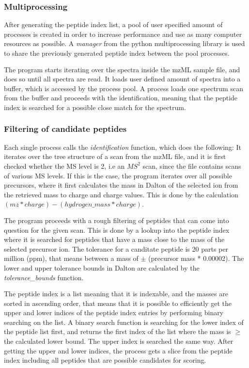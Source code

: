 \documentclass[11pt]{article}
\begin{document}
\subsubsection{Multiprocessing}
After generating the peptide index list, a pool of user specified amount of processes is created in order to increase performance and use as many computer resources as possible. A \textit{manager} from the python multiprocessing library is used to share the previously generated peptide index between the pool processes. 

The program starts iterating over the spectra inside the mzML sample file, and does so until all spectra are read. It loads user defined amount of spectra into a buffer, which is accessed by the process pool. A process loads one spectrum scan from the buffer and proceeds with the identification, meaning that the peptide index is searched for a possible close match for the spectrum.

\subsubsection{Filtering of candidate peptides}
Each single process calls the \textit{identification} function, which does the following:
It iterates over the tree structure of a scan from the mzML file, and it is first checked whether the MS level is 2, i.e an \(MS^2\) scan, since the file contains scans of various MS levels. If this is the case, the program iterates over all possible precursors, where it first calculates the mass in Dalton of the selected ion from the retrieved mass to charge and charge values. This is done by the calculation \begin{math}(mz * charge) - (hydrogen\_mass * charge)\end{math}.

The program proceeds with a rough filtering of peptides that can come into question for the given scan. This is done by a lookup into the peptide index where it is searched for peptides that have a mass close to the mass of the selected precursor ion. The tolerance for a canditate peptide is 20 parts per million (ppm), that means between a mass of $\pm$ (precursor mass * 0.00002). The lower and upper tolerance bounds in Dalton are calculated by the \textit{tolerance\_bounds} function. 

The peptide index is a list meaning that it is indexable, and the masses are sorted in ascending order, that means that it is possible to efficiently get the upper and lower indices of the peptide index entries by performing binary searching on the list. A binary search function is searching for the lower index of the peptide list first, and returns the first index of the list where the mass is $\ge$ the calculated lower bound. The upper index is searched the same way. After getting the upper and lower indices, the process gets a slice from the peptide index including all peptides that are possible candidates for scoring. 
\end{document}
